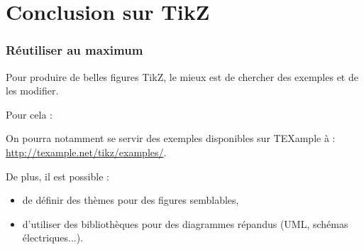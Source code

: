 \section{Conclusion sur TikZ}

\begin{frame}
  \frametitle{Réutiliser au maximum}

Pour produire de belles figures TikZ, le mieux est de chercher des exemples et de les modifier.

\begin{center}
Pour cela : \Huge {}
\end{center}

On pourra notamment se servir des exemples disponibles sur TEXample \cite{tikzandpgfexamples} à : \url{http://texample.net/tikz/examples/}.

\bigskip
De plus, il est possible :
\begin{itemize}
  \item de définir des thèmes pour des figures semblables,
  \item d'utiliser des bibliothèques pour des diagrammes répandus (UML, schémas électriques...).
\end{itemize}
\end{frame}
